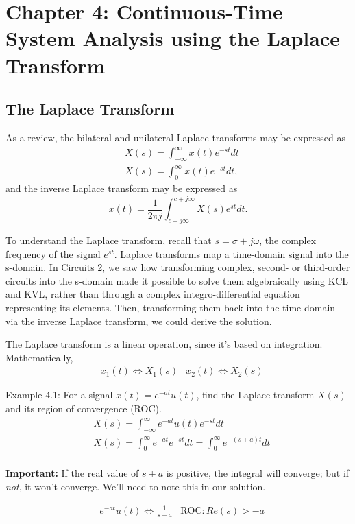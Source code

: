 \documentclass{article}
\begin{document}
\setcounter{section}{3}
\section{Chapter 4: Continuous-Time System Analysis using the Laplace Transform} 
\setcounter{subsection}{0}
\subsection{The Laplace Transform}
As a review, the bilateral and unilateral Laplace transforms may be expressed as 
\begin{align*}
	& X(s) = \int_{-\infty}^{\infty}x(t) e^{-st} dt \\
	& X(s) = \int_{0^-}^{\infty}x(t) e^{-st} dt,
\end{align*}
and the inverse Laplace transform may be expressed as 
\[
	x(t) = \frac{1}{2\pi j}\int_{c-j\infty}^{c+j\infty}X(s)e^{st}dt.
\]

To understand the Laplace transform, recall that \(s= \sigma + j\omega\), the complex frequency of the signal \(e^{st}\). Laplace transforms map a time-domain signal into the s-domain. In Circuits 2, we saw how transforming complex, second- or third-order circuits into the s-domain made it possible to solve them algebraically using KCL and KVL, rather than through a complex integro-differential equation representing its elements. Then, transforming them back into the time domain via the inverse Laplace transform, we could derive the solution.

The Laplace transform is a linear operation, since it's based on integration. Mathematically, 
\begin{align*}
	&x_1(t) \Longleftrightarrow X_1(s) &x_2(t) \Longleftrightarrow X_2(s)
\end{align*}

Example 4.1: For a signal \(x(t) = e^{-at}u(t)\), find the Laplace transform \(X(s)\) and its region of convergence (ROC).
\begin{align*}
	&X(s) = \int_{-\infty}^{\infty} e^{-at} u(t) e^{-st}dt \\
	&X(s) = \int_{0}^{\infty} e^{-at} e^{-st}dt = \int_{0}^{\infty}e^{-(s+a)t}dt \\
\end{align*}

\textbf{Important:} If the real value of \(s+a\) is positive, the integral will converge; but if \textit{not}, it won't converge. We'll need to note this in our solution.

\begin{align*}
	&e^{-at}u(t) \Longleftrightarrow \frac{1}{s+a} &\mathrm{ROC:} Re(s) > -a 
\end{align*}
\end{document}
